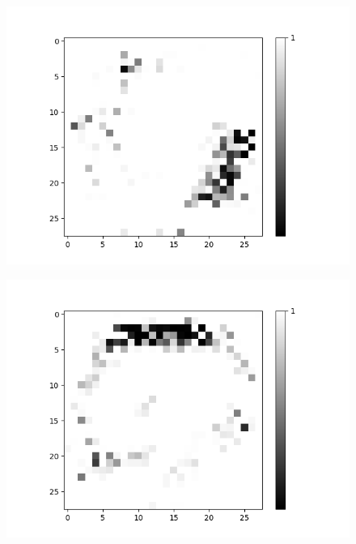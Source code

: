 \hspace{0.1\textwidth}
\begin{minipage}[t]{0.45\textwidth}
	\vspace{0cm}
	\begin{figure}[H]
		\begin{minipage}[b]{0.5\textwidth}
			\captionsetup{labelformat=empty}
			\includegraphics[width=\textwidth]{OR-AND(W-LSM)(1)/Like/True/Layer0-Neuron-18.png}
			\label{}
		\end{minipage}
		\begin{minipage}[b]{0.45\textwidth}
			\captionsetup{labelformat=empty}
			\includegraphics[width=\textwidth]{OR-AND(W-LSM)(1)/Like/True/Layer0-Neuron-19.png}
			\label{}
		\end{minipage}
		

\end{figure}
\end{minipage}
